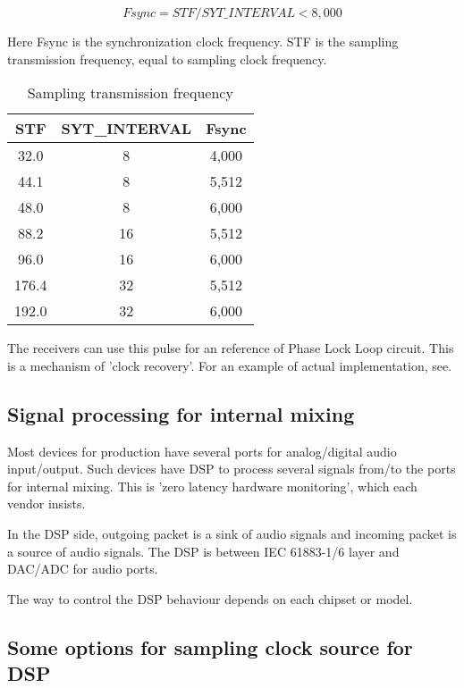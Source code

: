 \documentclass[onecolumn]{article}
\begin{document}
\begin{equation}
	Fsync = STF / SYT\_INTERVAL < 8,000
\end{equation}

Here Fsync is the synchronization clock frequency. STF is the sampling transmission frequency, equal to sampling clock frequency.

\begin{table}[H]
	\centering
	\caption{{Sampling transmission frequency}}
	\label{fsync}
	\begin{tabular}{ccc} \toprule
		STF & SYT\_INTERVAL & Fsync \\ \midrule
		32.0	& 8	& 4,000 \\
		44.1	& 8	& 5,512 \\
		48.0	& 8	& 6,000 \\
		88.2	& 16	& 5,512 \\
		96.0	& 16	& 6,000 \\
		176.4	& 32	& 5,512 \\
		192.0	& 32	& 6,000 \\ \bottomrule
	\end{tabular}
\end{table}

The receivers can use this pulse for an reference of Phase Lock Loop circuit. This is a mechanism of 'clock recovery'. For an example of actual implementation, see\cite{icelynx}.


\subsection{Signal processing for internal mixing}
\label{sec:internal-mixing}

Most devices for production have several ports for analog/digital audio input/output. Such devices have DSP to process several signals from/to the ports for internal mixing. This is 'zero latency hardware monitoring', which each vendor insists.

In the DSP side, outgoing packet is a sink of audio signals and incoming packet is a source of audio signals. The DSP is between IEC 61883-1/6 layer and DAC/ADC for audio ports.

The way to control the DSP behaviour depends on each chipset or model.

\subsection{Some options for sampling clock source for DSP}
\end{document}
